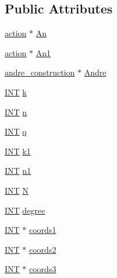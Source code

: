 \subsection*{Public Attributes}
\begin{DoxyCompactItemize}
\item 
\mbox{\hyperlink{classaction}{action}} $\ast$ \mbox{\hyperlink{classaction__on__andre_abd1366e86cf44d282ad5b0838df1ddd3}{An}}
\item 
\mbox{\hyperlink{classaction}{action}} $\ast$ \mbox{\hyperlink{classaction__on__andre_a43b7e6b78c24c70a82c301818ce3bca5}{An1}}
\item 
\mbox{\hyperlink{classandre__construction}{andre\+\_\+construction}} $\ast$ \mbox{\hyperlink{classaction__on__andre_a813bcc8f34aef3ee3294b7d8a9f1b2bc}{Andre}}
\item 
\mbox{\hyperlink{galois_8h_a09fddde158a3a20bd2dcadb609de11dc}{I\+NT}} \mbox{\hyperlink{classaction__on__andre_a22cfb75ca133b8b6e78099403b00dc35}{k}}
\item 
\mbox{\hyperlink{galois_8h_a09fddde158a3a20bd2dcadb609de11dc}{I\+NT}} \mbox{\hyperlink{classaction__on__andre_a0c60bc4acc6b52b82c7ec0201e8419d2}{n}}
\item 
\mbox{\hyperlink{galois_8h_a09fddde158a3a20bd2dcadb609de11dc}{I\+NT}} \mbox{\hyperlink{classaction__on__andre_ac7818152ccd1075dea85f92543c2732c}{q}}
\item 
\mbox{\hyperlink{galois_8h_a09fddde158a3a20bd2dcadb609de11dc}{I\+NT}} \mbox{\hyperlink{classaction__on__andre_a166d91ea519182bebc18fe437b56e056}{k1}}
\item 
\mbox{\hyperlink{galois_8h_a09fddde158a3a20bd2dcadb609de11dc}{I\+NT}} \mbox{\hyperlink{classaction__on__andre_a63b0f4ab78a6087685e26dc211f1c60e}{n1}}
\item 
\mbox{\hyperlink{galois_8h_a09fddde158a3a20bd2dcadb609de11dc}{I\+NT}} \mbox{\hyperlink{classaction__on__andre_aadd81f02a018300b38bc0462a8e4d41c}{N}}
\item 
\mbox{\hyperlink{galois_8h_a09fddde158a3a20bd2dcadb609de11dc}{I\+NT}} \mbox{\hyperlink{classaction__on__andre_a12e4d4b09414131599e9372f1f4e879d}{degree}}
\item 
\mbox{\hyperlink{galois_8h_a09fddde158a3a20bd2dcadb609de11dc}{I\+NT}} $\ast$ \mbox{\hyperlink{classaction__on__andre_ac3da6fdc863a34a2b956c4ebb9998370}{coords1}}
\item 
\mbox{\hyperlink{galois_8h_a09fddde158a3a20bd2dcadb609de11dc}{I\+NT}} $\ast$ \mbox{\hyperlink{classaction__on__andre_a579d0657403796f85d75a0c06d77b3a6}{coords2}}
\item 
\mbox{\hyperlink{galois_8h_a09fddde158a3a20bd2dcadb609de11dc}{I\+NT}} $\ast$ \mbox{\hyperlink{classaction__on__andre_a9fb124b86f15e174649d658da5a8f3a5}{coords3}}
\end{DoxyCompactItemize}


